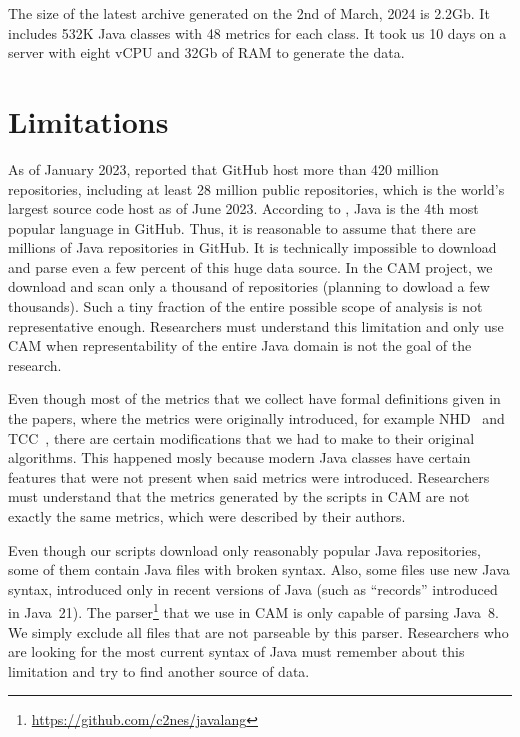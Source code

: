 \documentclass[11pt,sigplan,nonacm]{acmart}
\newcommand\cam{{\sffamily CAM}}
\begin{document}
The size of the latest archive generated on the 2nd of March, 2024 is 2.2Gb. It includes 532K Java classes with 48 metrics for each class. It took us 10 days on a server with eight vCPU and 32Gb of RAM to generate the data.

\section{Limitations}

As of January 2023, \citet{dohmke2023} reported that GitHub host more than 420 million repositories, including at least 28 million public repositories, which is the world's largest source code host as of June 2023. According to \citep{daigle2023}, Java is the 4th most popular language in GitHub. Thus, it is reasonable to assume that there are millions of Java repositories in GitHub. It is technically impossible to download and parse even a few percent of this huge data source. In the \cam{} project, we download and scan only a thousand of repositories (planning to dowload a few thousands). Such a tiny fraction of the entire possible scope of analysis is not representative enough. Researchers must understand this limitation and only use \cam{} when representability of the entire Java domain is not the goal of the research.

Even though most of the metrics that we collect have formal definitions given in the papers, where the metrics were originally introduced, for example NHD~\citep{counsell2006interpretation} and TCC~\citep{bieman1995cohesion}, there are certain modifications that we had to make to their original algorithms. This happened mosly because modern Java classes have certain features that were not present when said metrics were introduced. Researchers must understand that the metrics generated by the scripts in \cam{} are not exactly the same metrics, which were described by their authors.

Even though our scripts download only reasonably popular Java repositories, some of them contain Java files with broken syntax. Also, some files use new Java syntax, introduced only in recent versions of Java (such as ``records'' introduced in Java~21). The parser\footnote{\url{https://github.com/c2nes/javalang}} that we use in \cam{} is only capable of parsing Java~8. We simply exclude all files that are not parseable by this parser. Researchers who are looking for the most current syntax of Java must remember about this limitation and try to find another source of data.
\end{document}
